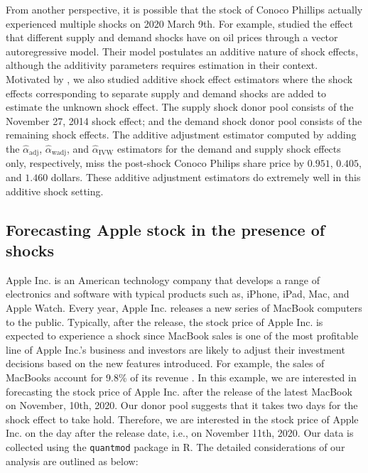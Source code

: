 \documentclass[11pt,3p,review,authoryear]{elsarticle}
\theoremstyle{definition}
\begin{document}
From another perspective, it is possible that the stock of Conoco Phillips actually experienced multiple shocks on 2020 March 9th. For example, \citet{kilian2009not} studied the effect that different supply and demand shocks have on oil prices through a vector autoregressive model. Their model postulates an additive nature of shock effects, although the additivity parameters requires estimation in their context. Motivated by \citet{kilian2009not}, we also studied additive shock effect estimators where the shock effects corresponding to separate supply and demand shocks are added to estimate the unknown shock effect. The supply shock donor pool consists of the November 27, 2014 shock effect; and the demand shock donor pool consists of the remaining shock effects. The additive adjustment estimator computed by adding the $\hat{\alpha}_{\text{adj}}$, $\hat{\alpha}_{\text{wadj}}$, and $\hat{\alpha}_{\text{IVW}}$ estimators for the demand and supply shock effects only, respectively, miss the post-shock Conoco Philips share price by $0.951$, $0.405$, and $1.460$ dollars. These additive adjustment estimators do extremely well in this additive shock setting. 

\subsection{Forecasting Apple stock in the presence of shocks}
\label{apple}

Apple Inc. is an American technology company that develops a range of electronics and software with typical products such as, iPhone, iPad, Mac, and Apple Watch. Every year, Apple Inc. releases a new series of MacBook computers to the public. Typically, after the release, the stock price of Apple Inc. is expected to experience a shock since MacBook sales is one of the most profitable line of Apple Inc.'s business and investors are likely to adjust their investment decisions based on the new features introduced. For example, the sales of MacBooks account for 9.8\% of its revenue \citep{applemac}. In this example, we are interested in forecasting the stock price of Apple Inc. after the release of the latest MacBook on November, 10th, 2020. Our donor pool suggests that it takes two days for the shock effect to take hold. Therefore, we are interested in the stock price of Apple Inc. on the day after the release date, i.e., on November 11th, 2020. Our data is collected using the \texttt{quantmod} package \citep{ryan2017quantmod} in R. The detailed considerations of our analysis are outlined as below:
\end{document}
